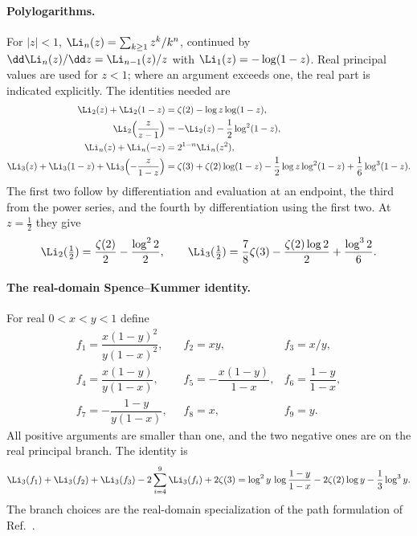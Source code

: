 \paragraph{Polylogarithms.} For $|z|<1$, $\Li_n(z)=\sum_{k\ge1}z^k/k^n$, continued by
$\dd\Li_n(z)/\dd z=\Li_{n-1}(z)/z$ with $\Li_1(z)=-\log(1-z)$. Real principal values are used for $z<1$; where an
argument exceeds one, the real part is indicated explicitly. The identities needed are
\begin{align}
 \Li_2(z)+\Li_2(1-z)&=\zeta(2)-\log z\log(1-z),\label{sri:eq:dualB:Euler}\\
 \Li_2\Bigl(\frac{z}{z-1}\Bigr)&=-\Li_2(z)-\frac12\log^2(1-z),\label{sri:eq:dualB:Li2Landen}\\
 \Li_n(z)+\Li_n(-z)&=2^{1-n}\Li_n(z^2),\label{sri:eq:dualB:dup}\\
 \Li_3(z)+\Li_3(1-z)+\Li_3\Bigl(-\frac z{1-z}\Bigr)&=\zeta(3)+\zeta(2)\log(1-z)-\frac12\log z\log^2(1-z)
 +\frac16\log^3(1-z).\label{sri:eq:dualB:Li3Landen}
\end{align}
The first two follow by differentiation and evaluation at an endpoint, the third from the power series, and the
fourth by differentiation using the first two. At $z=\frac12$ they give
\begin{equation}
 \Li_2(\tfrac12)=\frac{\zeta(2)}{2}-\frac{\log^22}{2},\qquad
 \Li_3(\tfrac12)=\frac78\zeta(3)-\frac{\zeta(2)\log2}{2}+\frac{\log^32}{6}.
 \label{sri:eq:dualB:halfvalues}
\end{equation}

\paragraph{The real-domain Spence--Kummer identity.} For real $0<x<y<1$ define
\begin{equation}
\begin{array}{lll}
 f_1=\dfrac{x(1-y)^2}{y(1-x)^2},\quad & f_2=xy,\quad & f_3=x/y,\\[3mm]
 f_4=\dfrac{x(1-y)}{y(1-x)}, & f_5=-\dfrac{x(1-y)}{1-x}, & f_6=\dfrac{1-y}{1-x},\\[3mm]
 f_7=-\dfrac{1-y}{y(1-x)}, & f_8=x, & f_9=y.
\end{array}
\end{equation}
All positive arguments are smaller than one, and the two negative ones are on the real principal branch. The identity
is
\begin{equation}
 \Li_3(f_1)+\Li_3(f_2)+\Li_3(f_3)-2\sum_{i=4}^{9}\Li_3(f_i)+2\zeta(3)
 =\log^2y\,\log\frac{1-y}{1-x}-2\zeta(2)\log y-\frac13\log^3y.
 \label{sri:eq:dualB:Kummerfull}
\end{equation}
The branch choices are the real-domain specialization of the path formulation of Ref.~\cite{sri:Shiraishi:2023}.

